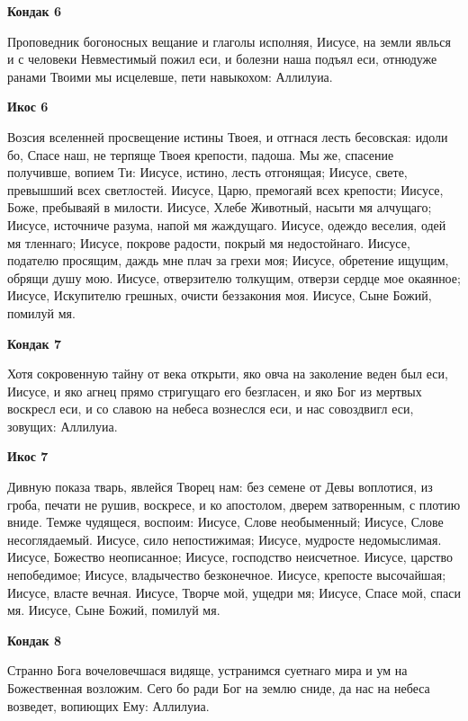 \medskip
\bfseries Кондак 6\normalfont{}\nopagebreak


Проповедник
богоносных вещание и глаголы исполняя, Иисусе, на земли явлься и с человеки Невместимый пожил еси, и болезни наша подъял еси, отнюдуже ранами Твоими мы исцелевше, пети навыкохом: Аллилуиа.


\medskip
\bfseries Икос 6\normalfont{}\nopagebreak


Возсия
вселенней просвещение истины Твоея, и отгнася лесть бесовская: идоли бо, Спасе наш, не терпяще Твоея крепости, падоша. Мы же, спасение получивше, вопием Ти: Иисусе, истино, лесть отгонящая; Иисусе, свете, превышший всех светлостей. Иисусе, Царю, премогаяй всех крепости; Иисусе, Боже, пребываяй в милости. Иисусе, Хлебе Животный, насыти мя алчущаго; Иисусе, источниче разума, напой мя жаждущаго. Иисусе, одеждо веселия, одей мя тленнаго; Иисусе, покрове радости, покрый мя недостойнаго. Иисусе, подателю просящим, даждь мне плач за грехи моя; Иисусе, обретение ищущим, обрящи душу мою. Иисусе, отверзителю толкущим, отверзи сердце мое окаянное; Иисусе, Искупителю грешных, очисти беззакония моя. Иисусе, Сыне Божий, помилуй мя.


\medskip
\bfseries Кондак 7\normalfont{}\nopagebreak


Хотя
сокровенную тайну от века открыти, яко овча на заколение веден был еси, Иисусе, и яко агнец прямо стригущаго его безгласен, и яко Бог из мертвых воскресл еси, и со славою на небеса вознеслся еси, и нас совоздвигл еси, зовущих: Аллилуиа. 


\medskip
\bfseries Икос 7\normalfont{}\nopagebreak


Дивную
показа тварь, явлейся Творец нам: без семене от Девы воплотися, из гроба, печати не рушив, воскресе, и ко апостолом, дверем затворенным, с плотию вниде. Темже чудящеся, воспоим: Иисусе, Слове необыменный; Иисусе, Слове несоглядаемый. Иисусе, сило непостижимая; Иисусе,
мудросте недомыслимая. Иисусе, Божество неописанное; Иисусе, господство неисчетное. Иисусе, царство непобедимое; Иисусе, владычество безконечное. Иисусе, крепосте высочайшая; Иисусе, власте вечная. Иисусе, Творче мой, ущедри мя; Иисусе, Спасе мой, спаси мя. Иисусе, Сыне Божий, помилуй мя.


\medskip
\bfseries Кондак 8\normalfont{}\nopagebreak


Странно
Бога вочеловечшася видяще, устранимся суетнаго мира и ум на Божественная возложим. Сего бо ради Бог на землю сниде, да нас на небеса возведет, вопиющих Ему: Аллилуиа. 



